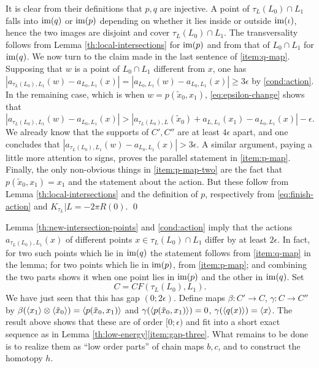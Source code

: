 \documentclass[10pt,letterpaper]{article}
\begin{document}
It is clear from their definitions that $p,q$ are injective. A point of
$\tau_L(L_0) \cap L_1$ falls into $\mathrm{im}(q)$ or $\mathrm{im}(p)$ depending on whether it
lies inside or outside $\mathrm{im}(\iota)$, hence the two images are disjoint and
cover $\tau_L(L_0) \cap L_1$. The transversality follows from Lemma
\ref{th:local-intersections} for $\mathrm{im}(p)$ and from that of $L_0 \cap L_1$ for
$\mathrm{im}(q)$. We now turn to the claim made in the last sentence of
\ref{item:q-map}. Supposing that $w$ is a point of $L_0 \cap L_1$ different
from $x$, one has $|a_{\tau_L(L_0),L_1}(w) - a_{L_0,L_1}(x)| = |a_{L_0,L_1}(w)
- a_{L_0,L_1}(x)| \geq 3\epsilon$ by \ref{cond:action}. In the remaining case,
which is when $w = p(\tilde{x}_0,x_1)$, \eqref{eq:epsilon-change} shows that
$|a_{\tau_L(L_0),L_1}(w) - a_{L_0,L_1}(x)| > |a_{\tau_L(L_0),L}(\tilde{x}_0) +
a_{L,L_1}(x_1) - a_{L_0,L_1}(x)| - \epsilon$. We already know that the supports
of $C',C''$ are at least $4\epsilon$ apart, and one concludes that
$|a_{\tau_L(L_0),L_1}(w) - a_{L_0,L_1}(x)| > 3\epsilon$. A similar argument,
paying a little more attention to signs, proves the parallel statement in
\ref{item:p-map}. Finally, the only non-obvious things in \ref{item:p-map-two}
are the fact that $p(\tilde{x}_0,x_1) = x_1$ and the statement about the
action. But these follow from Lemma \ref{th:local-intersections} and the
definition of $p$, respectively from \eqref{eq:finish-action} and $K_{\tau_L}|L
= -2\pi R(0)$. \qed

Lemma \ref{th:new-intersection-points} and \ref{cond:action} imply that the
actions $a_{\tau_L(L_0),L_1}(x)$ of different points $x \in \tau_L(L_0) \cap
L_1$ differ by at least $2\epsilon$. In fact, for two such points which lie in
$\mathrm{im}(q)$ the statement follows from \ref{item:q-map} in the lemma; for two
points which lie in $\mathrm{im}(p)$, from \ref{item:p-map}; and combining the two
parts shows it when one point lies in $\mathrm{im}(p)$ and the other in $\mathrm{im}(q)$. Set
\[
C = CF(\tau_L(L_0),L_1).
\]
We have just seen that this has gap $(0;2\epsilon)$. Define maps $\beta: C'
\rightarrow C$, $\gamma: C \rightarrow C''$ by $\beta(\langle x_1 \rangle \otimes
\langle \tilde{x}_0 \rangle) = \langle p(\tilde{x}_0,x_1) \rangle$ and
$\gamma(\langle p(\tilde{x}_0,x_1) \rangle) = 0$, $\gamma(\langle q(x) \rangle) = \langle x \rangle$. The
result above shows that these are of order $[0;\epsilon)$ and fit into a short
exact sequence as in Lemma \ref{th:low-energy}\ref{item:gap-three}. What
remains to be done is to realize them as ``low order parts'' of chain maps
$b,c$, and to construct the homotopy $h$.

%
\end{document}
